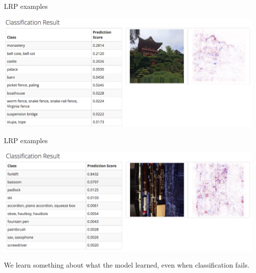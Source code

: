 \documentclass[xetex,compress]{beamer}
\begin{document}
\begin{frame}{LRP examples}
  \begin{center}
    \includegraphics[width=1.00\textwidth]{./figures/lrp_example_2.png}
  \end{center}
\end{frame}

\begin{frame}{LRP examples}
  \begin{center}
    \includegraphics[width=1.00\textwidth]{./figures/lrp_example_3.png}
  \end{center}
  We learn something about what the model learned, even when classification fails.
\end{frame}
\end{document}
